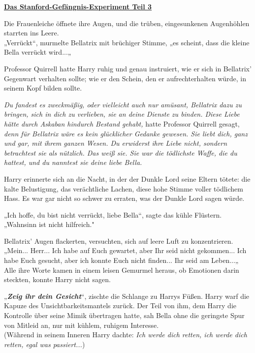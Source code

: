 

\hypertarget{das-stanford-gefuxe4ngnis-experiment-teil-3}{%

\textbf{\uline{Das Stanford-Gefängnis-Experiment Teil 3}}

Die Frauenleiche öffnete ihre Augen, und die trüben, eingesunkenen Augenhöhlen starrten ins Leere.\\ „Verrückt“, murmelte Bellatrix mit brüchiger Stimme, „es scheint, dass die kleine Bella verrückt wird...„

Professor Quirrell hatte Harry ruhig und genau instruiert, wie er sich in Bellatrix' Gegenwart verhalten sollte; wie er den Schein, den er aufrechterhalten würde, in seinem Kopf bilden sollte.

\emph{Du fandest es zweckmäßig, oder vielleicht auch nur amüsant, Bellatrix dazu zu bringen, sich in dich zu verlieben, sie an deine Dienste zu binden. Diese Liebe hätte durch Askaban hindurch Bestand gehabt,} hatte Professor Quirrell gesagt, \emph{denn für Bellatrix wäre es kein glücklicher Gedanke gewesen. Sie liebt dich, ganz und gar, mit ihrem ganzen Wesen. Du erwiderst ihre Liebe nicht, sondern betrachtest sie als nützlich. Das weiß sie. Sie war die tödlichste Waffe, die du hattest, und du nanntest sie deine liebe Bella.}

Harry erinnerte sich an die Nacht, in der der Dunkle Lord seine Eltern tötete: die kalte Belustigung, das verächtliche Lachen, diese hohe Stimme voller tödlichem Hass. Es war gar nicht so schwer zu erraten, was der Dunkle Lord sagen würde.

„Ich hoffe, du bist nicht verrückt, liebe Bella“, sagte das kühle Flüstern. „Wahnsinn ist nicht hilfreich."

Bellatrix' Augen flackerten, versuchten, sich auf leere Luft zu konzentrieren.\\ „Mein... Herr... Ich habe auf Euch gewartet, aber Ihr seid nicht gekommen... Ich habe Euch gesucht, aber ich konnte Euch nicht finden... Ihr seid am Leben...„\\ Alle ihre Worte kamen in einem leisen Gemurmel heraus, ob Emotionen darin steckten, konnte Harry nicht sagen.

„\textbf{\emph{Zeig ihr dein Gesicht}}“, zischte die Schlange zu Harrys Füßen. Harry warf die Kapuze des Unsichtbarkeitsmantels zurück. Der Teil von ihm, dem Harry die Kontrolle über seine Mimik übertragen hatte, sah Bella ohne die geringste Spur von Mitleid an, nur mit kühlem, ruhigem Interesse.\\ (Während in seinem Inneren Harry dachte: \emph{Ich werde dich retten, ich werde dich retten, egal was passiert...})

}
